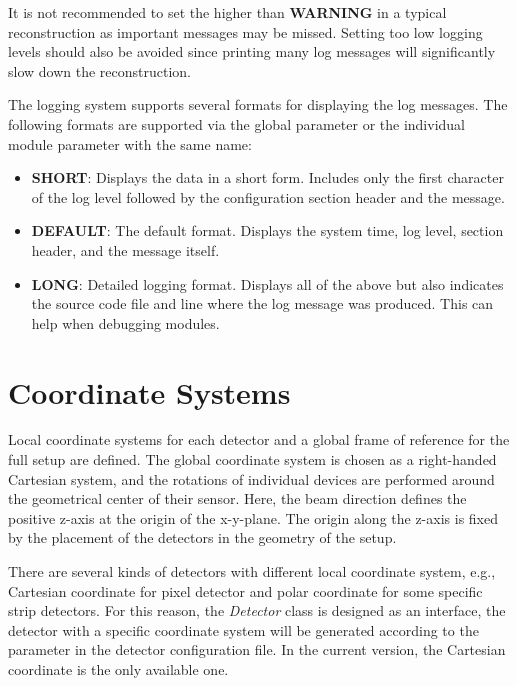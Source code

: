 \begin{warning}
    It is not recommended to set the  higher than \textbf{WARNING} in a typical reconstruction as important messages may be missed.
    Setting too low logging levels should also be avoided since printing many log messages will significantly slow down the reconstruction.
\end{warning}

The logging system supports several formats for displaying the log messages.
The following formats are supported via the global parameter  or the individual module parameter with the same name:
\begin{itemize}
\item \textbf{SHORT}: Displays the data in a short form.
Includes only the first character of the log level followed by the configuration section header and the message.
\item \textbf{DEFAULT}: The default format.
Displays the system time, log level, section header, and the message itself.
\item \textbf{LONG}: Detailed logging format.
Displays all of the above but also indicates the source code file and line where the log message was produced.
This can help when debugging modules.
\end{itemize}

\section{Coordinate Systems}
\label{sec:coordinate_systems}

Local coordinate systems for each detector and a global frame of reference for the full setup are defined.
The global coordinate system is chosen as a right-handed Cartesian system, and the rotations of individual devices are performed around the geometrical center of their sensor.
Here, the beam direction defines the positive z-axis at the origin of the x-y-plane.
The origin along the z-axis is fixed by the placement of the detectors in the geometry of the setup.

There are several kinds of detectors with different local coordinate system, e.g., Cartesian coordinate for pixel detector and polar coordinate for some specific strip detectors. For this reason, the \textsl{Detector} class is designed as an interface, the detector with a specific coordinate system will be generated according to the parameter in the detector configuration file. In the current version, the Cartesian coordinate is the only available one.

